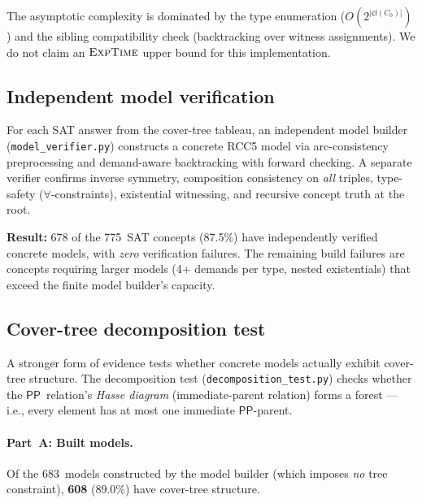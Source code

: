 \documentclass[a4paper,11pt]{article}
\theoremstyle{definition}
\newcommand{\PP}{\ensuremath{\mathsf{PP}}}
\newcommand{\cl}{\ensuremath{\mathsf{cl}}}
\newcommand{\EXPTIME}{\textsc{ExpTime}}
\begin{document}
The asymptotic complexity is dominated by the type enumeration
($O(2^{|\cl(C_0)|})$) and the sibling compatibility check
(backtracking over witness assignments).  We do not claim an
$\EXPTIME$ upper bound for this implementation.

\subsection{Independent model verification}

For each SAT answer from the cover-tree tableau, an independent
model builder (\texttt{model\_verifier.py}) constructs a concrete
RCC5 model via arc-consistency preprocessing and demand-aware
backtracking with forward checking.  A separate verifier confirms
inverse symmetry, composition consistency on \emph{all} triples,
type-safety ($\forall$-constraints), existential witnessing, and
recursive concept truth at the root.

\textbf{Result:} 678 of the 775~SAT concepts (87.5\%) have
independently verified concrete models, with \emph{zero}
verification failures.  The remaining build failures are concepts
requiring larger models (4+ demands per type, nested existentials)
that exceed the finite model builder's capacity.

\subsection{Cover-tree decomposition test}
\label{sec:decomposition}

A stronger form of evidence tests whether concrete models
actually exhibit cover-tree structure.  The decomposition test
(\texttt{decomposition\_test.py}) checks whether the $\PP$~relation's
\emph{Hasse diagram} (immediate-parent relation) forms a forest
--- i.e., every element has at most one immediate $\PP$-parent.

\paragraph{Part~A: Built models.}
Of the 683~models constructed by the model builder
(which imposes \emph{no} tree constraint), \textbf{608} (89.0\%)
have cover-tree structure.
\end{document}
